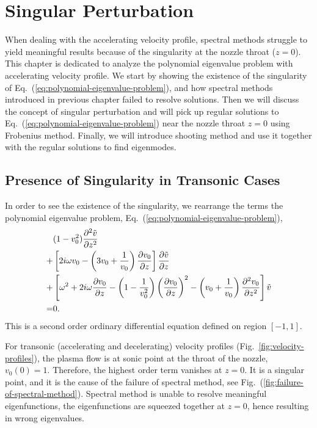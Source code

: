 \chapter{Singular Perturbation} \label{chap:singular-perturbation}
When dealing with the accelerating velocity profile, spectral methods struggle to yield meaningful results because of the singularity at the nozzle throat ($z=0$). This chapter is dedicated to analyze the polynomial eigenvalue problem with accelerating velocity profile. We start by showing the existence of the singularity of Eq.~(\ref{eq:polynomial-eigenvalue-problem}), and how spectral methods introduced in previous chapter failed to resolve solutions. Then we will discuss the concept of singular perturbation and will pick up regular solutions to Eq.~(\ref{eq:polynomial-eigenvalue-problem}) near the nozzle throat $z=0$ using Frobenius method. Finally, we will introduce shooting method and use it together with the regular solutions to find eigenmodes.

\section{Presence of Singularity in Transonic Cases} \label{sec:presence-of-singularity}
In order to see the existence of the singularity, we rearrange the terms the polynomial eigenvalue problem, Eq.~(\ref{eq:polynomial-eigenvalue-problem}),
\begin{equation} \label{eq:singular-perturbation-problem}
	\begin{aligned}
		  & (1-v_0^2)\pdv[2]{\tilde{v}}{z}                                                                                                                                        \\
		+ & \left[2i\omega v_0 - \left(3v_0 + \frac{1}{v_0}\right)\pdv{v_0}{z}\right]\pdv{\tilde{v}}{z}                                                                           \\
		+ & \left[\omega^2 + 2i\omega\pdv{v_0}{z} -\left(1 - \frac{1}{v_0^2}\right)\left(\pdv{v_0}{z}\right)^2 - \left(v_0 + \frac{1}{v_0}\right)\pdv[2]{v_0}{z} \right]\tilde{v} \\
		= & 0.
	\end{aligned}
\end{equation}
This is a second order ordinary differential equation defined on region $[-1,1]$.

For transonic (accelerating and decelerating) velocity profiles (Fig.~\ref{fig:velocity-profiles}), the plasma flow is at sonic point at the throat of the nozzle, $v_0(0)=1$. Therefore, the highest order term vanishes at $z=0$. It is a singular point, and it is the  cause of the failure of spectral method, see Fig.~(\ref{fig:failure-of-spectral-method}). Spectral method is unable to resolve meaningful eigenfunctions, the eigenfunctions are squeezed together at $z=0$, hence resulting in wrong eigenvalues.

